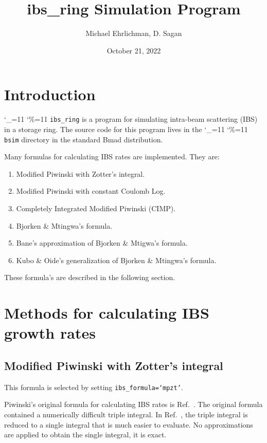 \documentclass[11pt]{article}
\title{ibs_ring Simulation Program}
\author{Michael Ehrlichman, D. Sagan}
\date{October 21, 2022}
\newcommand\ttcmd{\begingroup\catcode`\_=11 \catcode`\%=11 \dottcmd}
\newcommand\dottcmd[1]{\texttt{#1}\endgroup}
\newcommand{\vn}{\ttcmd}
\begin{document}
\maketitle

\tableofcontents

\section{Introduction} 
\label{s:intro}

\vn{ibs_ring} is a program for simulating intra-beam scattering (IBS) in a storage ring.
The source code for this program lives in the \vn{bsim} directory in
the standard Bmad\cite{b:bmad} distribution.

Many formulas for calculating IBS rates are implemented.  They are:
\begin{enumerate}
\item Modified Piwinski with Zotter's integral.
\item Modified Piwinski with constant Coulomb Log.
\item Completely Integrated Modified Piwinski (CIMP).
\item Bjorken \& Mtingwa's formula.
\item Bane's approximation of Bjorken \& Mtigwa's formula.
\item Kubo \& Oide's generalization of Bjorken \& Mtingwa's formula.
\end{enumerate}
These formula's are described in the following section.

\section{Methods for calculating IBS growth rates}

\subsection{Modified Piwinski with Zotter's integral}
This formula is selected by setting {\tt ibs_formula=`mpzt'}.

Piwinski's original formula for calculating IBS rates is Ref.~\cite{b:pw}.  The
original formula contained a numerically difficult triple integral.  In
Ref.~\cite{b:zotter}, the triple integral is reduced to a single integral that is 
much easier to evaluate.  No 
approximations are applied to obtain the single integral, it is exact.
\end{document}
